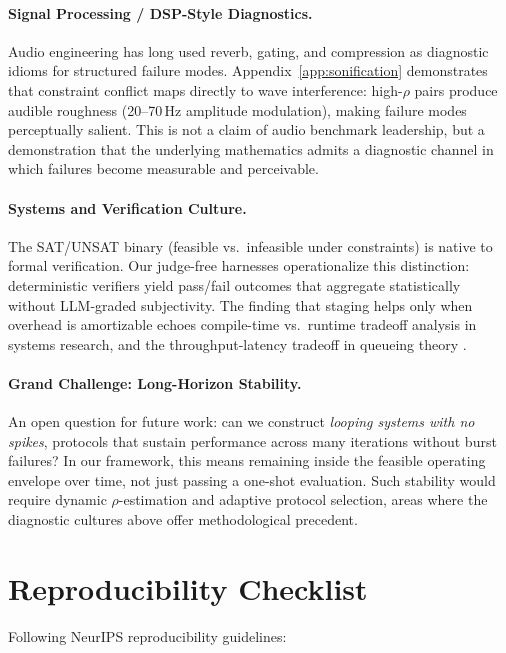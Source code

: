 \documentclass{article}
\theoremstyle{plain}
\theoremstyle{definition}
\theoremstyle{remark}
\begin{document}
\paragraph{Signal Processing / DSP-Style Diagnostics.}
Audio engineering has long used reverb, gating, and compression as diagnostic idioms for structured failure modes. Appendix~\ref{app:sonification} demonstrates that constraint conflict maps directly to wave interference: high-$\rho$ pairs produce audible roughness (20--70\,Hz amplitude modulation), making failure modes perceptually salient. This is not a claim of audio benchmark leadership, but a demonstration that the underlying mathematics admits a diagnostic channel in which failures become measurable and perceivable.

\paragraph{Systems and Verification Culture.}
The SAT/UNSAT binary (feasible vs.\ infeasible under constraints) is native to formal verification. Our judge-free harnesses operationalize this distinction: deterministic verifiers yield pass/fail outcomes that aggregate statistically without LLM-graded subjectivity. The finding that staging helps only when overhead is amortizable echoes compile-time vs.\ runtime tradeoff analysis in systems research, and the throughput-latency tradeoff in queueing theory \citep{little1961proof}.

\paragraph{Grand Challenge: Long-Horizon Stability.}
An open question for future work: can we construct \emph{looping systems with no spikes}, protocols that sustain performance across many iterations without burst failures? In our framework, this means remaining inside the feasible operating envelope over time, not just passing a one-shot evaluation. Such stability would require dynamic $\rho$-estimation and adaptive protocol selection, areas where the diagnostic cultures above offer methodological precedent.

\section{Reproducibility Checklist}\label{app:reproducibility}

Following NeurIPS reproducibility guidelines:
\end{document}
